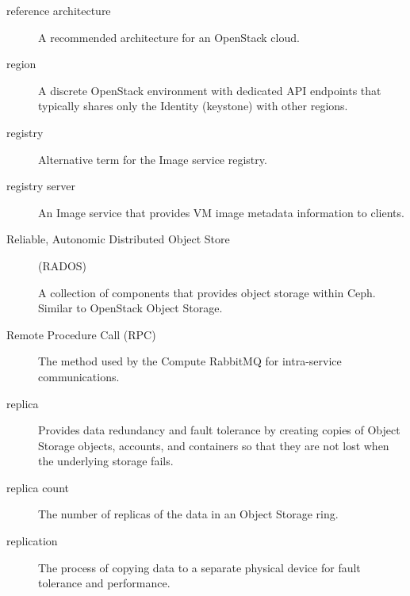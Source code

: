 \documentclass[letterpaper,10pt,english]{sphinxmanual}
\begin{document}
\begin{description}
\item[{reference architecture}] \leavevmode{}\label{_source/glossary:term-reference-architecture}
A recommended architecture for an OpenStack cloud.

\item[{region}] \leavevmode{}\label{_source/glossary:term-region}
A discrete OpenStack environment with dedicated API endpoints
that typically shares only the Identity (keystone) with other
regions.

\item[{registry}] \leavevmode{}\label{_source/glossary:term-registry}
Alternative term for the Image service registry.

\item[{registry server}] \leavevmode{}\label{_source/glossary:term-registry-server}
An Image service that provides VM image metadata information to
clients.

\item[{Reliable, Autonomic Distributed Object Store}] \leavevmode{}\label{_source/glossary:term-reliable-autonomic-distributed-object-store}
(RADOS)

A collection of components that provides object storage within
Ceph. Similar to OpenStack Object Storage.

\item[{Remote Procedure Call (RPC)}] \leavevmode{}\label{_source/glossary:term-remote-procedure-call-rpc}
The method used by the Compute RabbitMQ for intra-service
communications.

\item[{replica}] \leavevmode{}\label{_source/glossary:term-replica}
Provides data redundancy and fault tolerance by creating copies
of Object Storage objects, accounts, and containers so that they are
not lost when the underlying storage fails.

\item[{replica count}] \leavevmode{}\label{_source/glossary:term-replica-count}
The number of replicas of the data in an Object Storage
ring.

\item[{replication}] \leavevmode{}\label{_source/glossary:term-replication}
The process of copying data to a separate physical device for
fault tolerance and performance.


\end{description}
\end{document}
